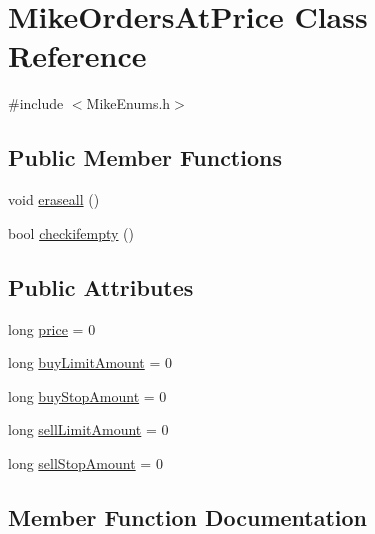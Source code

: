 \hypertarget{class_mike_orders_at_price}{}\section{Mike\+Orders\+At\+Price Class Reference}
\label{class_mike_orders_at_price}


{\ttfamily \#include $<$Mike\+Enums.\+h$>$}

\subsection*{Public Member Functions}
\begin{DoxyCompactItemize}
\item 
void \hyperlink{class_mike_orders_at_price_a97b206a07419b3b99a6e34bbeda513c7}{eraseall} ()
\item 
bool \hyperlink{class_mike_orders_at_price_a17f11e06543f5f50032a89e092754901}{checkifempty} ()
\end{DoxyCompactItemize}
\subsection*{Public Attributes}
\begin{DoxyCompactItemize}
\item 
long \hyperlink{class_mike_orders_at_price_a28e8937a97ce8afa492e35f36a9331bc}{price} = 0
\item 
long \hyperlink{class_mike_orders_at_price_ae8a30caef06eaa1d11a34075ea36fe8e}{buy\+Limit\+Amount} = 0
\item 
long \hyperlink{class_mike_orders_at_price_a5e095c1c6366fe5ce9352b813dd23299}{buy\+Stop\+Amount} = 0
\item 
long \hyperlink{class_mike_orders_at_price_a87062469afd61a164628353969d6e8a9}{sell\+Limit\+Amount} = 0
\item 
long \hyperlink{class_mike_orders_at_price_a64285a0b6338102576baea9d9e0d7e45}{sell\+Stop\+Amount} = 0
\end{DoxyCompactItemize}


\subsection{Member Function Documentation}
\mbox{\label{class_mike_orders_at_price_a17f11e06543f5f50032a89e092754901}} 
